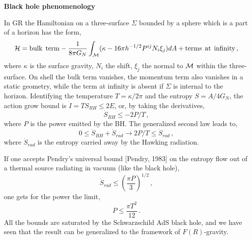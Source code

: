 \documentclass[ignorenonframetext,slidestop,compress]{beamer}
\begin{document}
\begin{frame}
{\bf Black hole phenomenology}

In GR the Hamiltonian on a three-surface $\Sigma$ bounded by a sphere which is a part of a horizon has the form,
\begin{equation*}
{\cal H}=\mathrm{bulk\;\,term}-\frac{1}{8\pi G_N}\int_{\cal M}(\kappa-
16\pi h^{-1/2}P^{ij}N_i\xi_j)dA +\mathrm{terms\;\,at\;\,infinity}\,,
\end{equation*}
where $\kappa$ is the surface gravity, $N_{i}$ the shift, $\xi_{j}$ the normal to ${\cal M}$ within the three-surface. On shell the bulk term vanishes, the momentum term also vanishes in a 
static geometry, while the term at infinity is absent if $\Sigma$ is internal to the horizon.
Identifying the temperature $T=\kappa/2\pi$ and the entropy $S=A/4G_N$, the action grow bound is 
$\dot{I}=TS_{BH}\leq 2E$, or, by taking the
derivatives,
\begin{equation*}
\dot{S}_{BH}\leq -2P/T\,,
\end{equation*}
where $P$ is the power emitted by the BH. The generalized second law leads to, 
\begin{equation*}
0\leq \dot{S}_{BH}+\dot{S}_{rad} \rightarrow
2P/T\leq \dot{S}_{rad}\,,
\end{equation*}
where $\dot{S}_{rad}$ is the entropy carried away by the Hawking radiation.
\end{frame}
 
\begin{frame}
 If one accepts  Pendry's universal bound [Pendry, 1983] on the entropy flow out of a thermal source radiating in vacuum (like the black hole),
\begin{equation*}
\dot{S}_{rad}\leq \left(\frac{\pi P}{3}\right)^{1/2}\,,
\end{equation*}
one gets for the power the limit,
\begin{equation*}
P\leq \frac{\pi T^2}{12}\,.
\end{equation*}
All the bounds are saturated by the Schwarzschild AdS black hole, and we have seen that the result can be generalized to the framework of $F(R)$-gravity. 
\end{frame}
\end{document}
